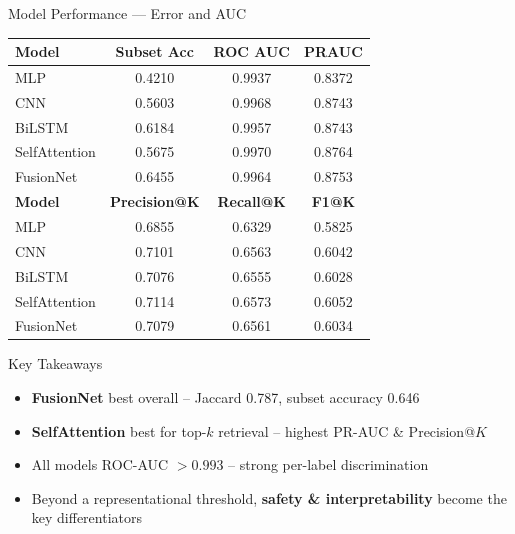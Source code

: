 \begin{frame}{Model Performance — Error and AUC}
\begin{table}
\centering
\begin{tabular}{lccc}
\toprule
\textbf{Model} & \textbf{Subset Acc} & \textbf{ROC AUC} & \textbf{PRAUC} \\
\midrule
MLP           & 0.4210 & 0.9937 & 0.8372 \\
CNN           & 0.5603 & 0.9968 & 0.8743 \\
BiLSTM        & 0.6184 & 0.9957 & 0.8743 \\
SelfAttention & 0.5675 & 0.9970 & 0.8764 \\
FusionNet     & 0.6455 & 0.9964 & 0.8753 \\
\midrule
\textbf{Model} & \textbf{Precision@K} & \textbf{Recall@K} & \textbf{F1@K} \\
\midrule
MLP           & 0.6855 & 0.6329 & 0.5825 \\
CNN           & 0.7101 & 0.6563 & 0.6042 \\
BiLSTM        & 0.7076 & 0.6555 & 0.6028 \\
SelfAttention & 0.7114 & 0.6573 & 0.6052 \\
FusionNet     & 0.7079 & 0.6561 & 0.6034 \\
\bottomrule
\end{tabular}
\end{table}
\end{frame}

%   

\begin{frame}{Key Takeaways}
  \begin{itemize}
    \item \textbf{FusionNet} best overall -- Jaccard 0.787, subset accuracy 0.646
    \pause
    \item \textbf{SelfAttention} best for top-$k$ retrieval -- highest PR-AUC \& Precision@$K$
    \pause
    \item All models ROC-AUC $> 0.993$ -- strong per-label discrimination
    \pause
    \item Beyond a representational threshold, \textbf{safety \& interpretability} become the key differentiators
  \end{itemize}
\end{frame}
